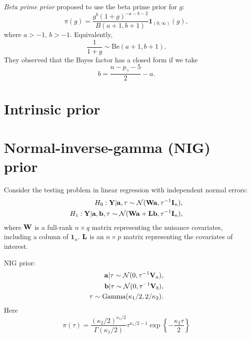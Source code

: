 \documentclass[11pt]{article}
\newcommand{\Ba}{\mathbf{a}}    \newcommand{\Bb}{\mathbf{b}}    \newcommand{\Bc}{\mathbf{c}}    \newcommand{\Bd}{\mathbf{d}}    \newcommand{\Be}{\mathbf{e}}    \newcommand{\Bf}{\mathbf{f}}    \newcommand{\Bg}{\mathbf{g}}    \newcommand{\Bh}{\mathbf{h}}    \newcommand{\Bi}{\mathbf{i}}    \newcommand{\Bj}{\mathbf{j}}    \newcommand{\Bk}{\mathbf{k}}    \newcommand{\Bl}{\mathbf{l}}
\newcommand{\BY}{\mathbf{Y}}    \newcommand{\BZ}{\mathbf{Z}}
\theoremstyle{plain}
\theoremstyle{definition}
\theoremstyle{remark}
\begin{document}
\emph{Beta prime prior}
\cite{maruyama2011} proposed to use the beta prime prior for $g$:
\begin{equation*}
    \pi(g)=\frac{g^b (1+g)^{-a-b-2}}{B(a+1,b+1)}\mathbf{1}_{(0,\infty)}(g),
\end{equation*}
where $a>-1$, $b>-1$.
Equivalently,
\begin{equation*}
    \frac{1}{1+g}\sim \text{Be} (a+1,b+1).
\end{equation*}
They observed that the Bayes factor has a closed form if we take
\begin{equation*}
    b=\frac{n-p_\gamma-5}{2}-a.
\end{equation*}





\section{Intrinsic prior}


\section{Normal-inverse-gamma (NIG) prior}
\cite{zhou2018On}

Consider the testing problem in linear regression with independent normal errors:
\begin{equation*}
    \begin{split}
    H_0:
    \BY|\Ba,\tau \sim \mathcal N (\BW \Ba,\tau^{-1}\BI_n),
    \\
    H_1:
    \BY|\Ba,\Bb, \tau \sim \mathcal N (\BW \Ba + \BL \Bb, \tau^{-1} \BI_n),
    \end{split}
\end{equation*}
where $\mathbf{W}$ is a full-rank $n\times q$ matrix representing the nuisance covariates, including a column of $\mathbf 1_n$.
$\mathbf{L}$ is an $n\times p$ matrix representing the covariates of interest.

NIG prior:
\begin{equation*}
    \begin{split}
        \Ba | \tau \sim \mathcal N (0, \tau^{-1} \BV_a),
        \\
        \Bb | \tau \sim \mathcal N (0, \tau^{-1} \BV_b),
        \\
        \tau \sim \text{Gamma} (\kappa_1/2,2/\kappa_2)
        .
    \end{split}
\end{equation*}
Here
\begin{equation*}
        \pi(\tau) =\frac{(\kappa_2/2)^{\kappa_1/2}}{\Gamma (\kappa_1/2)}
        \tau^{\kappa_1/2-1} \exp\left\{-\frac{\kappa_2 \tau}{2}\right\}
\end{equation*}
\end{document}
